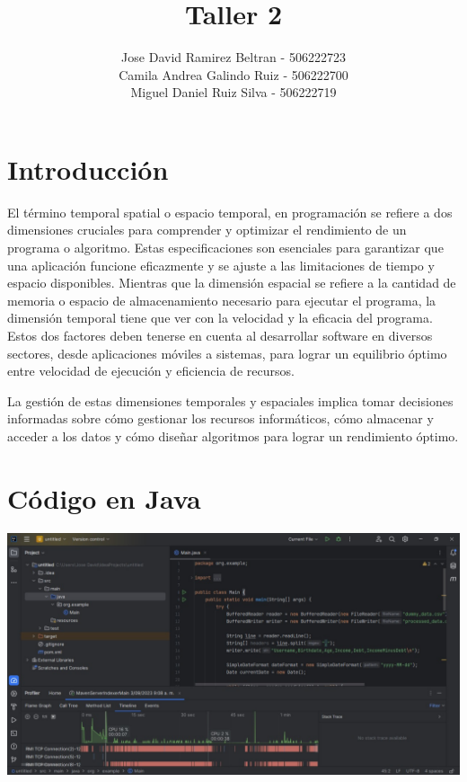 \documentclass[a4paper,twocolumn,10pt]{article}
\title{Taller 2 }
\author{Jose David Ramirez Beltran - 506222723\\Camila Andrea Galindo Ruiz - 506222700\\Miguel Daniel Ruiz Silva - 506222719}
\begin{document}
\maketitle

\section{Introducción}
El término temporal spatial o espacio temporal, en programación se refiere a dos dimensiones cruciales para comprender y optimizar el rendimiento de un programa o algoritmo. Estas especificaciones son esenciales para garantizar que una aplicación funcione eficazmente y se ajuste a las limitaciones de tiempo y espacio disponibles. Mientras que la dimensión espacial se refiere a la cantidad de memoria o espacio de almacenamiento necesario para ejecutar el programa, la dimensión temporal tiene que ver con la velocidad y la eficacia del programa. Estos dos factores deben tenerse en cuenta al desarrollar software en diversos sectores, desde aplicaciones móviles a sistemas, para lograr un equilibrio óptimo entre velocidad de ejecución y eficiencia de recursos.

La gestión de estas dimensiones temporales y espaciales implica tomar decisiones informadas sobre cómo gestionar los recursos informáticos, cómo almacenar y acceder a los datos y cómo diseñar algoritmos para lograr un rendimiento óptimo.


\section{Código en Java}

\includegraphics[width=0.85\linewidth]{HP AMD E1-1200 APU/java.jpg}
\end{document}

